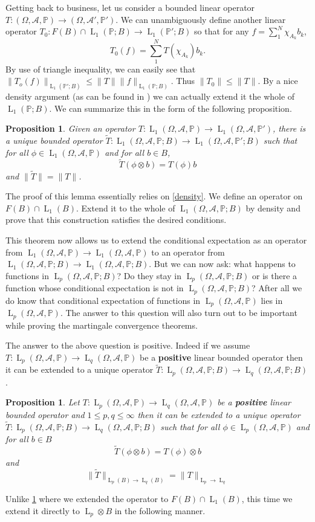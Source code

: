 \documentclass[]{report}
\newcommand{\lp}[2]{\operatorname{L}_{#1}({#2})}
\newcommand*{\Normb}[2]{\lVert {#1} \rVert_{#2}}
\newcommand*{\Normu}[1]{\lVert {#1} \rVert}
\newcommand{\pspc}{\Omega,\mathcal{A},\mathbb{P}}
\newcommand{\pspca}[2]{\Omega,{#1},\mathbb{#2}}
\newtheorem{prop}[theorem]{Proposition}
\begin{document}
Getting back to business, let us consider a bounded linear operator $T: (\pspc)\rightarrow (\pspca{\mathcal A'}{\mathbb{P}'})$. We can unambiguously define another linear operator $T_0: F(B)\cap \lp{1}{\mathbb{P};B}\rightarrow \lp{1}{\mathbb{P}';B}$ so that for any $f=\sum_{1}^{N}\chi_{A_k}b_k$, 
\[ T_0(f)=\sum_{1}^{N}T(\chi_{A_k})b_k. \]
By use of triangle inequality, we can easily see that $\Normb{T_o(f)}{\lp{1}{\mathbb{P}';B}} \leq \Normu{T}\Normb{f}{\lp{1}{\mathbb{P};B}}$. Thus $\Normu{T_0}\leq\Normu{T}$. By a nice density argument (as can be found in \cite{pis}) we can actually extend it the whole of $\lp{1}{\mathbb{P};B}$. We can summarize this in the form of the following proposition. 

\begin{prop}\label{L1op}
	Given an operator $T: \lp{1}{\pspc} \rightarrow \lp{1}{\Omega,\mathcal{A}, \mathbb{P}'}$, there is a unique bounded operator $\tilde{T}: \lp{1}{\pspc;B} \rightarrow \lp{1}{\Omega,\mathcal{A}, \mathbb{P}';B}$ such that for all $\phi \in \lp{1}{\pspc}$ and for all $b\in B$,
	\[ \tilde{T}(\phi\otimes b)=T(\phi)b \] and $\Normu{\tilde{T}}=\Normu{T}$.
\end{prop}
The proof of this lemma essentially relies on \ref{density}. We define an operator on $F(B)\cap \lp{1}{B}$. Extend it to the whole of $\lp{1}{\pspc;B}$ by density and prove that this construction satisfies the desired conditions. 

This theorem now allows us to extend the conditional expectation as an operator from $ \lp{1}{\pspc} \rightarrow  \lp{1}{\pspc}$ to an operator from $ \lp{1}{\pspc;B}\rightarrow  \lp{1}{\pspc;B}$. But we can now ask: what happens to functions in $ \lp{p}{\pspc;B}$? Do they stay in $ \lp{p}{\pspc;B}$ or is there a function whose conditional expectation is not in $\lp{p}{\pspc;B}$? After all we do know that conditional expectation of functions in $ \lp{p}{\pspc}$ lies in $ \lp{p}{\pspc}$. The answer to this question will also turn out to be important while proving the martingale convergence theorems. 

The answer to the above question is positive. Indeed if we assume $T:\lp{p}{\pspc} \rightarrow \lp{q}{\pspc} $ be a \textbf{positive} linear bounded operator then it can be extended to a unique operator $ \tilde{T}: \lp{p}{\pspc;B} \rightarrow \lp{q}{\pspc;B}$.

\begin{prop}\label{Lpop}
	Let $T:\lp{p}{\pspc} \rightarrow \lp{q}{\pspc} $ be a \textbf{positive} linear bounded operator and $1\leq p,q \leq \infty$ then it can be extended to a unique operator $ \tilde{T}: \lp{p}{\pspc;B} \rightarrow \lp{q}{\pspc;B}$ such that for all $\phi \in \lp{p}{\pspc}$ and for all $b\in B$ \[ \tilde{T}(\phi\otimes b)=T(\phi)\otimes b \] 
	and \[ \Normb{\tilde{T}}{\lp{p}{B}\rightarrow \lp{q}{B}}= \Normb{T}{\operatorname{L}_p \rightarrow \operatorname{L}_q} \]
\end{prop}
Unlike \ref{L1op} where we extended the operator to $F(B)\cap \lp{1}{B}$, this time we extend it directly to $\operatorname{L}_p \otimes B$ in the following manner. 
\end{document}
